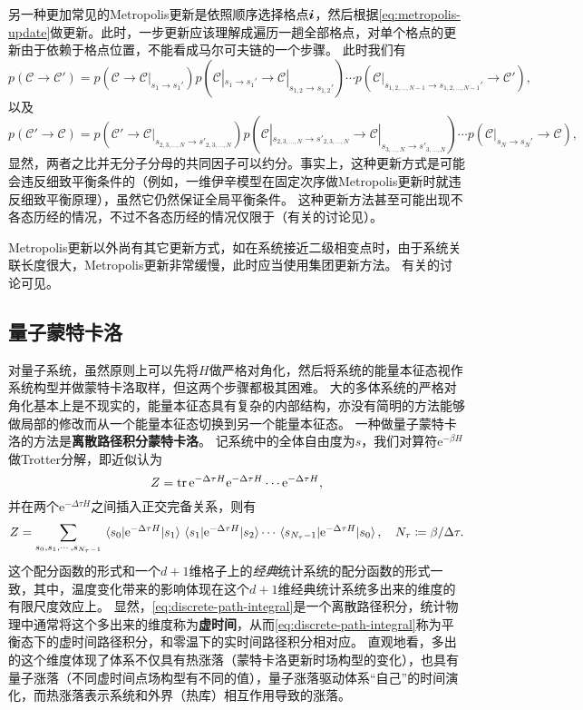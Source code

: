 \documentclass[hyperref, UTF8]{ctexart}
\newcommand*{\ee}{\mathrm{e}}
\newcommand*{\concept}[1]{{\textbf{#1}}}
\begin{document}
另一种更加常见的Metropolis更新是依照顺序选择格点$\vb*{i}$，然后根据\eqref{eq:metropolis-update}做更新。此时，一步更新应该理解成遍历一趟全部格点，对单个格点的更新由于依赖于格点位置，不能看成马尔可夫链的一个步骤。
此时我们有
\begin{equation}
    p(\mathcal{C} \to \mathcal{C}') = p(\mathcal{C} \to \mathcal{C}|_{s_{1} \to s_{1}'}) p(\mathcal{C}|_{s_{1} \to s_{1}'} \to \mathcal{C}|_{s_{1, 2} \to s_{1, 2}'}) \cdots p(\mathcal{C}|_{s_{1, 2, \ldots, N-1} \to s_{1, 2, \ldots, N-1}'} \to \mathcal{C}'),
\end{equation}
以及
\begin{equation}
    p(\mathcal{C}' \to \mathcal{C}) = p(\mathcal{C}' \to \mathcal{C}|_{s_{2, 3, \ldots, N} \to s'_{2, 3, \ldots, N}}) p(\mathcal{C}|_{s_{2, 3, \ldots, N} \to s'_{2, 3, \ldots, N}} \to \mathcal{C}|_{s_{3, \ldots, N} \to s'_{3, \ldots, N}}) \cdots p(\mathcal{C}|_{s_N \to s_{N}'} \to \mathcal{C}),
\end{equation}
显然，两者之比并无分子分母的共同因子可以约分。事实上，这种更新方式是可能会违反细致平衡条件的（例如，一维伊辛模型在固定次序做Metropolis更新时就违反细致平衡原理\cite{manousiouthakis1999strict}），虽然它仍然保证全局平衡条件。
这种更新方法甚至可能出现不各态历经的情况，不过不各态历经的情况仅限于（有关的讨论见\cite{brugge2021convergence}）。

Metropolis更新以外尚有其它更新方式，如在系统接近二级相变点时，由于系统关联长度很大，Metropolis更新非常缓慢，此时应当使用集团更新方法。
有关的讨论可见\cite{binder1993monte}。

\subsection{量子蒙特卡洛}

对量子系统，虽然原则上可以先将$H$做严格对角化，然后将系统的能量本征态视作系统构型并做蒙特卡洛取样，但这两个步骤都极其困难。
大的多体系统的严格对角化基本上是不现实的，能量本征态具有复杂的内部结构，亦没有简明的方法能够做局部的修改而从一个能量本征态切换到另一个能量本征态。
一种做量子蒙特卡洛的方法是\concept{离散路径积分蒙特卡洛}。
记系统中的全体自由度为$s$，我们对算符$\ee^{- \beta H}$做Trotter分解，即近似认为
\[
    Z = \trace \ee^{- \Delta \tau H} \ee^{- \Delta \tau H} \cdots \ee^{- \Delta \tau H},
\] 
并在两个$\ee^{- \Delta \tau H}$之间插入正交完备关系，则有
\begin{equation}
    Z = \sum_{s_0, s_1, \cdots, s_{N_\tau - 1}} \mel{s_0}{\ee^{- \Delta \tau H}}{s_1} \mel{s_1}{\ee^{- \Delta \tau H}}{s_2} \cdots \mel{s_{N_\tau - 1}}{\ee^{- \Delta \tau H}}{s_0}, \quad N_\tau \coloneqq \beta / \Delta \tau.
    \label{eq:discrete-path-integral}
\end{equation}
这个配分函数的形式和一个$d+1$维格子上的\emph{经典}统计系统的配分函数的形式一致，其中，温度变化带来的影响体现在这个$d+1$维经典统计系统多出来的维度的有限尺度效应上。
显然，\eqref{eq:discrete-path-integral}是一个离散路径积分，统计物理中通常将这个多出来的维度称为\concept{虚时间}，从而\eqref{eq:discrete-path-integral}称为平衡态下的虚时间路径积分，和零温下的实时间路径积分相对应。
直观地看，多出的这个维度体现了体系不仅具有热涨落（蒙特卡洛更新时场构型的变化），也具有量子涨落（不同虚时间点场构型有不同的值），量子涨落驱动体系“自己”的时间演化，而热涨落表示系统和外界（热库）相互作用导致的涨落。
\end{document}
